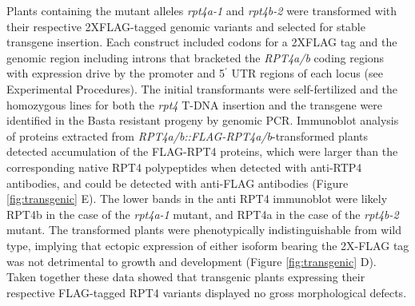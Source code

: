Plants containing the mutant alleles \textit{rpt4a-1} and \textit{rpt4b-2} were transformed with their respective 2XFLAG-tagged genomic variants and selected for stable transgene insertion. Each construct included codons for a 2XFLAG tag and the genomic region including introns that bracketed the \textit{RPT4a/b} coding regions with expression drive by the promoter and 5$^{\prime}$ UTR regions of each locus (see Experimental Procedures). The initial transformants were self-fertilized and the homozygous lines for both the \textit{rpt4} T-DNA insertion and the transgene were identified in the Basta resistant progeny by genomic PCR.  Immunoblot analysis of proteins extracted from \textit{RPT4a/b::FLAG-RPT4a/b}-transformed plants detected accumulation of the FLAG-RPT4 proteins, which were larger than the corresponding native RPT4 polypeptides when detected with anti-RTP4 antibodies, and could be detected with anti-FLAG antibodies (Figure \ref{fig:transgenic} E).  The lower bands in the anti RPT4 immunoblot were likely RPT4b in the case of the \textit{rpt4a-1} mutant, and RPT4a in the case of the \textit{rpt4b-2} mutant. The transformed plants were phenotypically indistinguishable from wild type, implying that ectopic expression of either isoform bearing the 2X-FLAG tag was not detrimental to growth and development (Figure \ref{fig:transgenic} D).  Taken together these data showed that transgenic plants expressing their respective FLAG-tagged RPT4 variants displayed no gross morphological defects.

